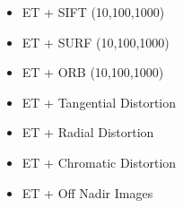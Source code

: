 \label{sec:FeatureTest}

\begin{itemize}
    \item ET + SIFT (10,100,1000)
    \item ET + SURF (10,100,1000)
    \item ET + ORB  (10,100,1000)
\end{itemize}

\label{sec:DistortionTest}

\begin{itemize}
    \item ET + Tangential Distortion
    \item ET + Radial Distortion
    \item ET + Chromatic Distortion
    \item ET + Off Nadir Images
\end{itemize}

\label{sec:expcon}